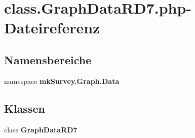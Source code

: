 \section{class.GraphDataRD7.php-Dateireferenz}
\label{class_8GraphDataRD7_8php}
\subsection*{Namensbereiche}
\begin{CompactItemize}
\item 
namespace {\bf mkSurvey.Graph.Data}
\end{CompactItemize}
\subsection*{Klassen}
\begin{CompactItemize}
\item 
class {\bf GraphDataRD7}
\end{CompactItemize}
